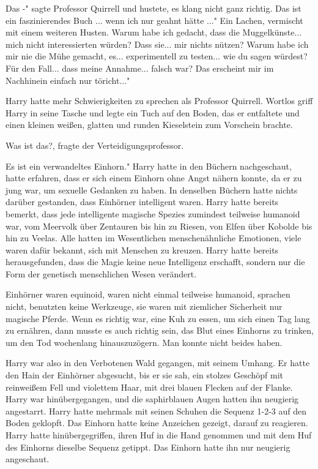 \glqq Das -" sagte Professor Quirrell und hustete, es klang nicht ganz richtig.
\glqq Das ist ein faszinierendes Buch ... wenn ich nur geahnt hätte ..." Ein
Lachen, vermischt mit einem weiteren Husten. \glqq Warum habe ich gedacht, dass
die Muggelkünste... mich nicht interessierten würden? Dass sie... mir nichts
nützen? Warum habe ich mir nie die Mühe gemacht, es... experimentell zu
testen... wie du sagen würdest? Für den Fall... dass meine Annahme... falsch
war? Das erscheint mir im Nachhinein einfach nur töricht..."

Harry hatte mehr Schwierigkeiten zu sprechen als Professor Quirrell. Wortlos
griff Harry in seine Tasche und legte ein Tuch auf den Boden, das er entfaltete
und einen kleinen weißen, glatten und runden Kieselstein zum Vorschein brachte.

\glqq Was ist das?\grqq{}, fragte der Verteidigungsprofessor.

\glqq Es ist ein verwandeltes Einhorn." Harry hatte in den Büchern nachgeschaut,
hatte erfahren, dass er sich einem Einhorn ohne Angst nähern konnte, da er zu
jung war, um sexuelle Gedanken zu haben. In denselben Büchern hatte nichts
darüber gestanden, dass Einhörner intelligent waren. Harry hatte bereits
bemerkt, dass jede intelligente magische Spezies zumindest teilweise humanoid
war, vom Meervolk über Zentauren bis hin zu Riesen, von Elfen über Kobolde bis
hin zu Veelas. Alle hatten im Wesentlichen menschenähnliche Emotionen, viele
waren dafür bekannt, sich mit Menschen zu kreuzen. Harry hatte bereits
herausgefunden, dass die Magie keine neue Intelligenz erschafft, sondern nur die
Form der genetisch menschlichen Wesen verändert.

Einhörner waren equinoid, waren nicht einmal teilweise humanoid, sprachen nicht,
benutzten keine Werkzeuge, sie waren mit ziemlicher Sicherheit nur magische
Pferde. Wenn es richtig war, eine Kuh zu essen, um sich einen Tag lang zu
ernähren, dann musste es auch richtig sein, das Blut eines Einhorns zu trinken,
um den Tod wochenlang hinauszuzögern. Man konnte nicht beides haben.

Harry war also in den Verbotenen Wald gegangen, mit seinem Umhang. Er hatte den
Hain der Einhörner abgesucht, bis er sie sah, ein stolzes Geschöpf mit
reinweißem Fell und violettem Haar, mit drei blauen Flecken auf der Flanke.
Harry war hinübergegangen, und die saphirblauen Augen hatten ihn neugierig
angestarrt. Harry hatte mehrmals mit seinen Schuhen die Sequenz 1-2-3 auf den
Boden geklopft. Das Einhorn hatte keine Anzeichen gezeigt, darauf zu reagieren.
Harry hatte hinübergegriffen, ihren Huf in die Hand genommen und mit dem Huf des
Einhorns dieselbe Sequenz getippt. Das Einhorn hatte ihn nur neugierig
angeschaut.

